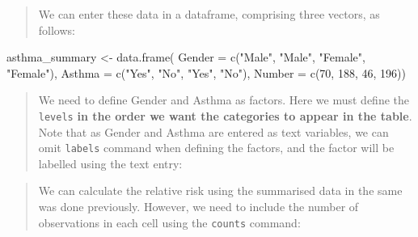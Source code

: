 \documentclass[
]{memoir}
\newenvironment{Shaded}{\begin{snugshade}}{\end{snugshade}}
\newcommand{\AttributeTok}[1]{\textcolor[rgb]{0.77,0.63,0.00}{#1}}
\newcommand{\DecValTok}[1]{\textcolor[rgb]{0.00,0.00,0.81}{#1}}
\newcommand{\FunctionTok}[1]{\textcolor[rgb]{0.00,0.00,0.00}{#1}}
\newcommand{\NormalTok}[1]{#1}
\newcommand{\OtherTok}[1]{\textcolor[rgb]{0.56,0.35,0.01}{#1}}
\newcommand{\SpecialCharTok}[1]{\textcolor[rgb]{0.00,0.00,0.00}{#1}}
\newcommand{\StringTok}[1]{\textcolor[rgb]{0.31,0.60,0.02}{#1}}
\begin{document}
\begin{quote}
We can enter these data in a dataframe, comprising three vectors, as follows:
\end{quote}

\begin{Shaded}
\begin{Highlighting}[]
\NormalTok{asthma\_summary }\OtherTok{\textless{}{-}} \FunctionTok{data.frame}\NormalTok{(}
  \AttributeTok{Gender =} \FunctionTok{c}\NormalTok{(}\StringTok{"Male"}\NormalTok{, }\StringTok{"Male"}\NormalTok{, }\StringTok{"Female"}\NormalTok{, }\StringTok{"Female"}\NormalTok{),}
  \AttributeTok{Asthma =} \FunctionTok{c}\NormalTok{(}\StringTok{"Yes"}\NormalTok{, }\StringTok{"No"}\NormalTok{, }\StringTok{"Yes"}\NormalTok{, }\StringTok{"No"}\NormalTok{),}
  \AttributeTok{Number =} \FunctionTok{c}\NormalTok{(}\DecValTok{70}\NormalTok{, }\DecValTok{188}\NormalTok{, }\DecValTok{46}\NormalTok{, }\DecValTok{196}\NormalTok{))}
\end{Highlighting}
\end{Shaded}

\begin{quote}
We need to define Gender and Asthma as factors. Here we must define the \texttt{levels} \textbf{in the order we want the categories to appear in the table}. Note that as Gender and Asthma are entered as text variables, we can omit \texttt{labels} command when defining the factors, and the factor will be labelled using the text entry:
\end{quote}

\begin{Shaded}
\end{Shaded}

\begin{quote}
We can calculate the relative risk using the summarised data in the same was done previously. However, we need to include the number of observations in each cell using the \texttt{counts} command:
\end{quote}
\end{document}
